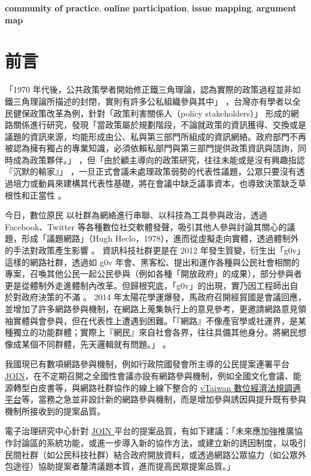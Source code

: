 \documentclass[12pt,a4paper]{article}
\begin{document}
\textbf{community of practice}, \textbf{online participation}, \textbf{issue mapping}, \textbf{argument map}
\section{前言}
\label{sec:orgd3fb060}
「1970 年代後，公共政策學者開始修正鐵三角理論，認為實際的政策過程並非如鐵三角理論所描述的封閉，實則有許多公私組織參與其中」 \citep*{luo15_gong} ，台灣亦有學者以全民健保政策改革為例，針對「政策利害關係人（policy stakeholders）」\citep{dunn94_public} 形成的網路關係進行研究，發現「當政策屬於規劃階段，不論就政策的資訊獲得、交換或是議題的資訊來源，均能形成由公、私與第三部門所組成的資訊網絡。政府部門不再被認為擁有獨占的專業知識，必須依賴私部門與第三部門提供政策資訊與諮詢，同時成為政策夥伴。」\citep{luo2005} ，但「由於顧主導向的政策研究，往往未能或是沒有興趣指認『沉默的輸家』」\citep*{chen11} ，一旦正式會議未處理政策弱勢的代表性議題，公眾只要沒有透過培力或動員來建構其代表性基礎，將在會議中缺乏議事資本，也導致決策缺乏草根性和正當性 \citep*{lo17}。

今日，數位原民 \citep*{prensky2001digital} 以社群為網絡進行串聯、以科技為工具參與政治，透過 Facebook、Twitter 等各種數位社交軟體發聲，吸引其他人參與討論其關心的議題，形成「議題網路」（Hugh Heclo，1978），進而從虛擬走向實體，透過體制外的手法對政策產生影響 \citep*{xue11_xiang} 。 資訊科技社群更是在 2012 年發生質變，衍生出「g0v」這樣的網路社群，透過如 g0v 年會、黑客松、提出和運作各種與公民社會相關的專案，召喚其他公民一起公民參與（例如各種「開放政府」的成果），部分參與者更是從體制外走進體制內改革。但歸根究底，「g0v」的出現，實乃因工程師出自於對政府決策的不滿 \citep*{zheng18} 。 2014 年太陽花學運爆發，馬政府召開經貿國是會議回應，並增加了許多網路參與機制，在網路上蒐集執行上的意見參考，更邀請網路意見領袖實體與會參與，但在代表性上遭遇到困難。「『網路』不像產官學或社運界，是某種獨立的功能群體；實際上『網民』來自社會各界，往往具備其他身分。將網民想像成某個不同群體，先天邏輯就有問題。」\citep*{albert2014} 。

我國現已有數項網路參與機制，例如行政院國發會所主導的公民提案連署平台 \href{https://join.gov.tw}{JOIN}，在不定期召開之全國性會議亦設有網路參與機制，例如全國文化會議、能源轉型白皮書等，與網路社群協作的線上線下整合的 \href{https://vtaiwan.tw/}{vTaiwan 數位經濟法規調適平台}等，當務之急並非設計新的網路參與機制，而是增加參與誘因與提升既有參與機制所接收到的提案品質。

電子治理研究中心針對 \href{https://join.gov.tw}{JOIN }平台的提案品質，有如下建議：「未來應加強推廣協作討論區的系統功能，或進一步導入新的協作方法，或建立新的誘因制度，以吸引民間社群（如公民科技社群）結合政府開放資料，或透過網路公眾協力（如公眾外包途徑）協助提案者釐清議題本質，進而提高民眾提案品質。」\citep{liao18}
\end{document}
